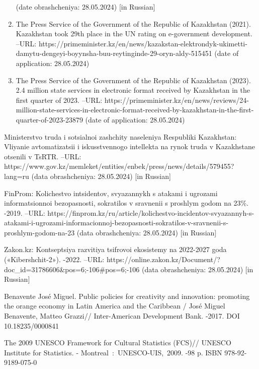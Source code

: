 \begin{enumerate}
  (date obrashcheniya: 28.05.2024) {[}in Russian{]}
\item
  The Press Service of the Government of the Republic of Kazakhstan
  (2021). Kazakhstan took 29th place in the UN rating on e-government
  development. --URL:
  https://primeminister.kz/en/news/kazakstan-elektrondyk-ukimetti-damytu-dengeyi-boyynsha-buu-reytinginde-29-oryn-aldy-515451
  (date of application: 28.05.2024)
\item
  The Press Service of the Government of the Republic of Kazakhstan
  (2023). 2.4 million state services in electronic format received by
  Kazakhstan in the first quarter of 2023. --URL:
  https://primeminister.kz/en/news/reviews/24-million-state-services-in-electronic-format-received-by-kazakhstan-in-the-first-quarter-of-2023-23879
  (date of application: 28.05.2024)
\end{enumerate}

Ministerstvo truda i sotsial\textquotesingle noi zashchity naseleniya
Respubliki Kazakhstan: Vliyanie avtomatizatsii i iskusstvennogo
intellekta na rynok truda v Kazakhstane otsenili v TsRTR. --URL:
https://www.gov.kz/memleket/entities/enbek/press/news/details/579455?lang=ru
(data obrashcheniya: 28.05.2024) {[}in Russian{]}

FinProm: Kolichestvo intsidentov, svyazannykh s atakami i ugrozami
informatsionnoi bezopasnosti, sokratilos\textquotesingle{} v sravnenii s
proshlym godom na 23\%. -2019. --URL:
https://finprom.kz/ru/article/kolichestvo-incidentov-svyazannyh-s-atakami-i-ugrozami-informacionnoj-bezopasnosti-sokratilos-v-sravnenii-s-proshlym-godom-na-23
(data obrashcheniya: 28.05.2024) {[}in Russian{]}

Zakon.kz: Kontseptsiya razvitiya tsifrovoi ekosistemy na 2022-2027 goda
(«Kibershchit-2»). -2022. --URL:
https://online.zakon.kz/Document/?doc\_id=31786606\&pos=6;-106\#pos=6;-106
(data obrashcheniya: 28.05.2024) {[}in Russian{]}

Benavente José Miguel. Public policies for creativity and innovation:
promoting the orange economy in Latin America and the Caribbean / José
Miguel Benavente, Matteo Grazzi// Inter-American Development Bank.
-2017. DOI 10.18235/0000841

The 2009 UNESCO Framework for Cultural Statistics (FCS)// UNESCO
Institute for Statistics. - Montreal~:~UNESCO-UIS,~2009. -98 p. ISBN
978-92-9189-075-0

